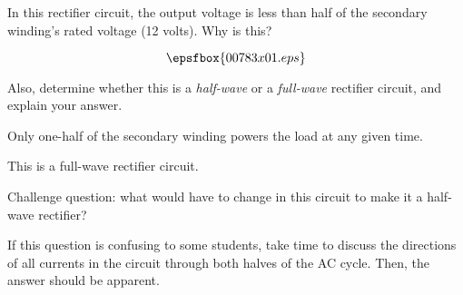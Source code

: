 

In this rectifier circuit, the output voltage is less than half of the secondary winding's rated voltage (12 volts).  Why is this?

$$\epsfbox{00783x01.eps}$$

Also, determine whether this is a {\it half-wave} or a {\it full-wave} rectifier circuit, and explain your answer.







Only one-half of the secondary winding powers the load at any given time.

\vskip 10pt

This is a full-wave rectifier circuit.

\vskip 10pt

Challenge question: what would have to change in this circuit to make it a half-wave rectifier?







If this question is confusing to some students, take time to discuss the directions of all currents in the circuit through both halves of the AC cycle.  Then, the answer should be apparent.




